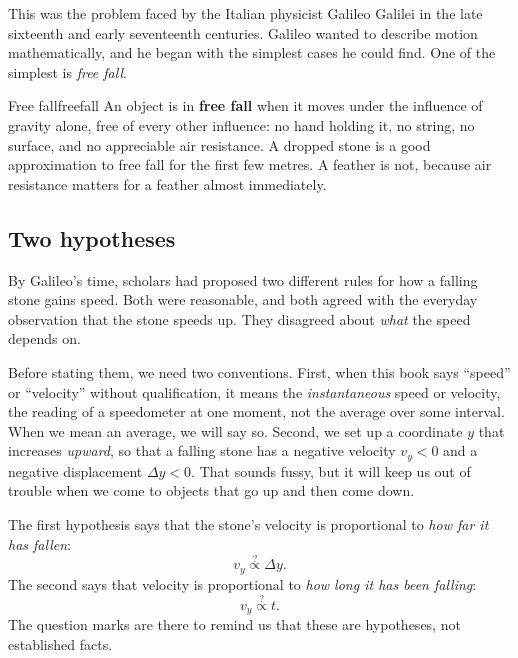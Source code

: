 \documentclass[11pt,twoside,openany]{book}
\begin{document}
This was the problem faced by the Italian physicist Galileo Galilei in the late sixteenth and early seventeenth centuries. Galileo wanted to describe motion mathematically, and he began with the simplest cases he could find. One of the simplest is \emph{free fall}.

\begin{definition}{Free fall}{freefall}
An object is in \textbf{free fall} when it moves under the influence of gravity alone, free of every other influence: no hand holding it, no string, no surface, and no appreciable air resistance. A dropped stone is a good approximation to free fall for the first few metres. A feather is not, because air resistance matters for a feather almost immediately.
\end{definition}

\subsection{Two hypotheses}

By Galileo's time, scholars had proposed two different rules for how a falling stone gains speed. Both were reasonable, and both agreed with the everyday observation that the stone speeds up. They disagreed about \emph{what} the speed depends on.

Before stating them, we need two conventions. First, when this book says ``speed'' or ``velocity'' without qualification, it means the \emph{instantaneous} speed or velocity, the reading of a speedometer at one moment, not the average over some interval. When we mean an average, we will say so. Second, we set up a coordinate $y$ that increases \emph{upward}, so that a falling stone has a negative velocity $v_y < 0$ and a negative displacement $\Delta y < 0$. That sounds fussy, but it will keep us out of trouble when we come to objects that go up and then come down.

The first hypothesis says that the stone's velocity is proportional to \emph{how far it has fallen}:
\begin{equation}
v_y \overset{?}{\propto} \Delta y.
\label{eq:hypA}
\end{equation}
The second says that velocity is proportional to \emph{how long it has been falling}:
\begin{equation}
v_y \overset{?}{\propto} t.
\label{eq:hypB}
\end{equation}
The question marks are there to remind us that these are hypotheses, not established facts.
\end{document}
